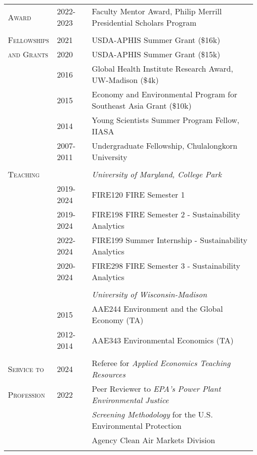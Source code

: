 \documentclass[letterpaper,11pt,oneside]{article}\usepackage[]{graphicx}\usepackage[]{xcolor}
\begin{document}
\noindent \begin{tabular}{p{1.2in} p{0.9in} l}     

\textsc{Award} & 2022-2023 & Faculty Mentor Award, Philip Merrill Presidential Scholars Program \\	
               & & \\
\textsc{Fellowships}	& 2021				& USDA-APHIS Summer Grant (\$16k) \\
\textsc{and Grants }	& 2020				& USDA-APHIS Summer Grant (\$15k) \\
                    	& 2016				& Global Health Institute Research Award, UW-Madison (\$4k) \\
                    	& 2015				& Economy and Environmental Program for Southeast Asia Grant (\$10k) \\
                    	& 2014				& Young Scientists Summer Program Fellow, IIASA \\
                    	& 2007-2011		& Undergraduate Fellowship, Chulalongkorn University \\
                    	& & \\        
\textsc{Teaching}     & & \textit{University of Maryland, College Park} \\
                      & 2019-2024     & FIRE120 FIRE Semester 1 \\
		                  & 2019-2024     & FIRE198 FIRE Semester 2 - Sustainability Analytics \\
                      & 2022-2024     & FIRE199 Summer Internship - Sustainability Analytics \\
				              & 2020-2024	    & FIRE298 FIRE Semester 3 - Sustainability Analytics \\
                      & & \\  
                      &               & \textit{University of Wisconsin-Madison} \\
				              & 2015          & AAE244 Environment and the Global Economy (TA) \\
				              & 2012-2014     & AAE343 Environmental Economics (TA)\\
                      & & \\
\textsc{Service to}   & 2024          & Referee for \textit{Applied Economics Teaching Resources} \\
\textsc{Profession}   & 2022          & Peer Reviewer to \textit{EPA's Power Plant Environmental Justice} \\
                  		&               & \textit{Screening Methodology} for the U.S. Environmental Protection  \\
                      &               & Agency Clean Air Markets Division \\
                      & & \\
\end{tabular}                      
\newpage                         
                      
\end{document}

